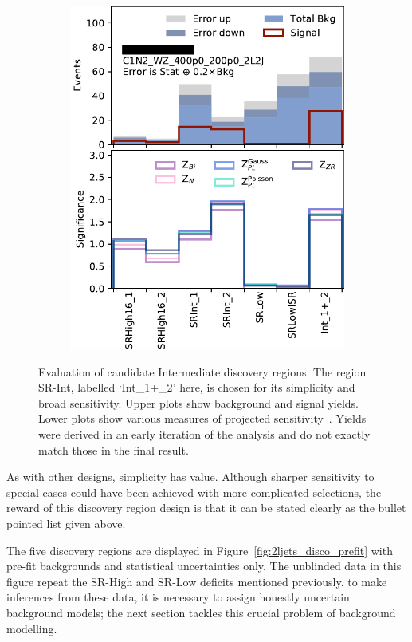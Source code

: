 \begin{figure}[tp]
\begin{subfigure}{0.48\textwidth}
\includegraphics[width=\textwidth]{figures/2ljets_disco_Int_C1N2_WZ_400p0_200p0_2L2J.png}
\caption{}
\end{subfigure}
\caption[
Evaluation of candidate Intermediate discovery regions
]{%
Evaluation of candidate Intermediate discovery regions.
The region SR-Int, labelled `Int\_1+\_2' here, is chosen for its simplicity
and broad sensitivity.
Upper plots show background and signal yields.
Lower plots show various measures of projected
sensitivity~\cite{cousins2008evaluation}.
Yields were derived in an early iteration of the analysis and do not exactly
match those in the final result.
}
\label{fig:2ljets_disco_trials_int}
\end{figure}

As with other designs, simplicity has value.
Although sharper sensitivity to special cases could have been achieved
with more complicated selections, the reward of this discovery region design
is that it can be stated clearly as the bullet pointed list given above.

The five discovery regions are displayed in
Figure~\ref{fig:2ljets_disco_prefit}
with pre-fit backgrounds and statistical uncertainties only.
The unblinded data in this figure repeat the SR-High and SR-Low deficits
mentioned previously.
to make inferences from these data, it is necessary to assign honestly
uncertain background models; the next section tackles this crucial problem of
background modelling.

